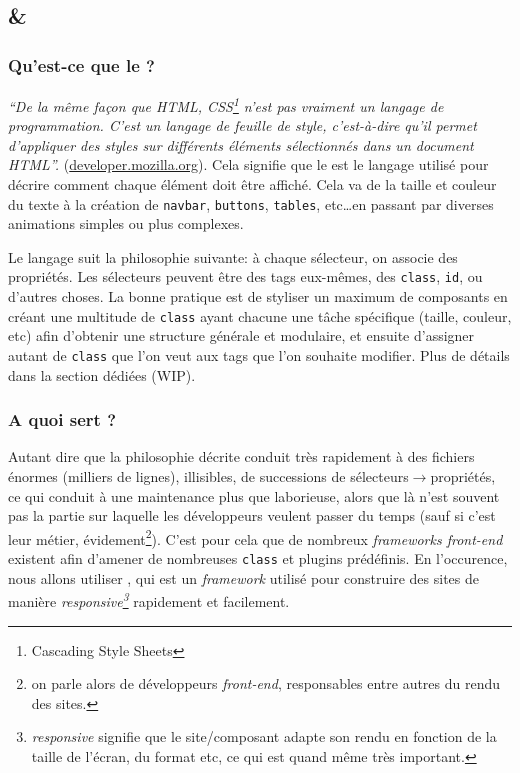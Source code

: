 \subsection[Bootstrap et CSS]{\bs{} \& \css{}}
\subsubsection[Qu'est-ce que le CSS?][fr.wikipedia.org/wiki/Feuilles\_de\_style\_en\_cascade]{Qu'est-ce que le \css{}?}\label{sec:css} 
\textit{``De la même façon que HTML, CSS\footnote{Cascading Style Sheets} n'est pas vraiment un langage de programmation. C'est un langage de feuille de style, c'est-à-dire qu'il permet d'appliquer des styles sur différents éléments sélectionnés dans un document HTML''.} (\href{https://developer.mozilla.org/fr/docs/Learn/Getting_started_with_the_web/CSS_basics}{developer.mozilla.org}). Cela signifie que le \css{} est le langage utilisé pour décrire comment chaque élément \html{} doit être affiché. Cela va de la taille et couleur du texte à la création de \verb|navbar|, \verb|buttons|, \verb|tables|, etc\ldots en passant par diverses animations simples ou plus complexes.

Le langage suit la philosophie suivante: à chaque sélecteur, on associe des propriétés. Les sélecteurs peuvent être des tags \html{} eux-mêmes, des \verb|class|, \verb|id|, ou d'autres choses. La bonne pratique est de styliser un maximum de composants en créant une multitude de \verb|class| ayant chacune une tâche spécifique (taille, couleur, etc) afin d'obtenir une structure générale et modulaire, et ensuite d'assigner autant de \verb|class| que l'on veut aux tags \html{} que l'on souhaite modifier. Plus de détails dans la section dédiées (WIP).

\subsubsection[A quoi sert Bootstrap?][fr.wikipedia.org/wiki/Bootstrap\_(framework)]{A quoi sert \bs{}?}
Autant dire que la philosophie décrite conduit très rapidement à des fichiers énormes (milliers de lignes), illisibles, de successions de sélecteurs$\rightarrow$propriétés, ce qui conduit à une maintenance plus que laborieuse, alors que là n'est souvent pas la partie sur laquelle les développeurs veulent passer du temps (sauf si c'est leur métier, évidement\footnote{on parle alors de développeurs \textit{front-end}, responsables entre autres du rendu des sites.}). C'est pour cela que de nombreux \textit{frameworks front-end} existent afin d'amener de nombreuses \verb|class| et plugins \js{} prédéfinis. En l'occurence, nous allons utiliser \bs{}, qui est un \textit{framework} utilisé pour construire des sites de manière \textit{responsive\footnote{\textit{responsive} signifie que le site/composant adapte son rendu en fonction de la taille de l'écran, du format etc, ce qui est quand même très important.}} rapidement et facilement.

